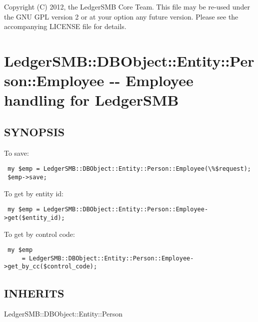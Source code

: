 \begin{description}
\begin{description}
\begin{description}
\begin{description}
\begin{description}
\begin{description}
\begin{description}
\begin{description}
Copyright (C) 2012, the LedgerSMB Core Team.  This file may be re-used under the GNU GPL
version 2 or at your option any future version.  Please see the accompanying LICENSE 
file for details.

\section{LedgerSMB::DBObject::Entity::Person::Employee -{}- Employee handling for LedgerSMB\label{LedgerSMB::DBObject::Entity::Person::Employee_-_-_Employee_handling_for_LedgerSMB}}




\subsection*{SYNOPSIS\label{LedgerSMB::DBObject::Entity::Person::Employee_-_-_Employee_handling_for_LedgerSMB_SYNOPSIS}}


To save:

\begin{verbatim}
 my $emp = LedgerSMB::DBObject::Entity::Person::Employee(\%$request);
 $emp->save;
\end{verbatim}


To get by entity id:

\begin{verbatim}
 my $emp = LedgerSMB::DBObject::Entity::Person::Employee->get($entity_id);
\end{verbatim}


To get by control code:

\begin{verbatim}
 my $emp 
     = LedgerSMB::DBObject::Entity::Person::Employee->get_by_cc($control_code);
\end{verbatim}
\subsection*{INHERITS\label{LedgerSMB::DBObject::Entity::Person::Employee_-_-_Employee_handling_for_LedgerSMB_INHERITS}}
\begin{description}

\item[{LedgerSMB::DBObject::Entity::Person}] \mbox{}\end{description}

\end{description}
\end{description}
\end{description}
\end{description}
\end{description}
\end{description}
\end{description}
\end{description}
